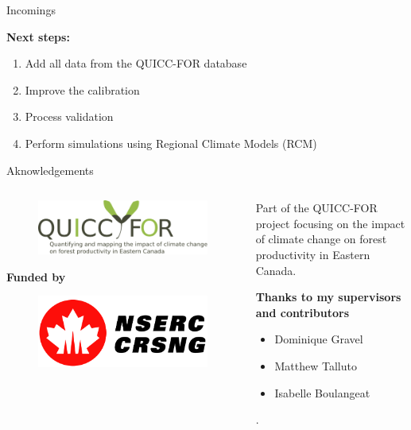 \documentclass[10pt,aspectratio=149]{beamer}
\begin{document}
\begin{frame}{Incomings}

\textbf{Next steps:}
\begin{enumerate}
	\item Add all data from the QUICC-FOR database
	\item Improve the calibration
	\item Process validation 
	\item Perform simulations using Regional Climate Models (RCM)
\end{enumerate}

\end{frame}


\begin{frame}[plain]{Aknowledgements}

\begin{columns}[t]
	\begin{column}[t]{.40\paperwidth}
		\begin{figure}
			\includegraphics[width=0.7\linewidth]{logo.png}
		\end{figure}
		\vspace{2em}
		\centering \small{\textbf{Funded by}}
		\begin{figure}
			\includegraphics[width=0.5\linewidth]{nserc.png}
		\end{figure}
	\end{column}
	\begin{column}[t]{.50\paperwidth}

	Part of the QUICC-FOR project focusing on the impact of climate change on forest productivity in Eastern Canada.

	\vspace{3em}

	\textbf{Thanks to my supervisors and contributors}

	\begin{itemize}
		\item Dominique Gravel
		\item Matthew Talluto
		\item Isabelle Boulangeat
	\end{itemize}. 

	\end{column}
\end{columns}


\end{frame}
\end{document}
